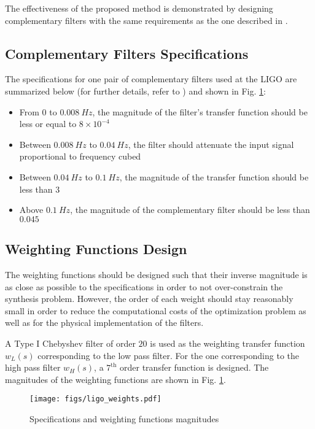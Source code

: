 \documentclass[conference]{IEEEtran}
\begin{document}
The effectiveness of the proposed method is demonstrated by designing complementary filters with the same requirements as the one described in \cite{hua05_low_ligo}.
\subsection{Complementary Filters Specifications}
\label{sec:orgfeebf2a}
\label{sec:ligo_specifications}
The specifications for one pair of complementary filters used at the LIGO are summarized below (for further details, refer to \cite{hua04_polyp_fir_compl_filter_contr_system}) and shown in Fig. \ref{fig:ligo_weights}:
\begin{itemize}
\item From \(0\) to \(\SI{0.008}{Hz}\), the magnitude of the filter's transfer function should be less or equal to \(8 \times 10^{-4}\)
\item Between \(\SI{0.008}{Hz}\) to \(\SI{0.04}{Hz}\), the filter should attenuate the input signal proportional to frequency cubed
\item Between \(\SI{0.04}{Hz}\) to \(\SI{0.1}{Hz}\), the magnitude of the transfer function should be less than \(3\)
\item Above \(\SI{0.1}{Hz}\), the magnitude of the complementary filter should be less than \(0.045\)
\end{itemize}

\subsection{Weighting Functions Design}
\label{sec:orgd9046dc}
\label{sec:ligo_weights}
The weighting functions should be designed such that their inverse magnitude is as close as possible to the specifications in order to not over-constrain the synthesis problem.
However, the order of each weight should stay reasonably small in order to reduce the computational costs of the optimization problem as well as for the physical implementation of the filters.

A Type I Chebyshev filter of order \(20\) is used as the weighting transfer function \(w_L(s)\) corresponding to the low pass filter.
For the one corresponding to the high pass filter \(w_H(s)\), a \(7^{\text{th}}\) order transfer function is designed.
The magnitudes of the weighting functions are shown in Fig. \ref{fig:ligo_weights}.

\begin{figure}[htbp]
\centering
\texttt{[image: figs/ligo\_weights.pdf]}
\caption{\label{fig:ligo_weights}
Specifications and weighting functions magnitudes}
\end{figure}
\end{document}
